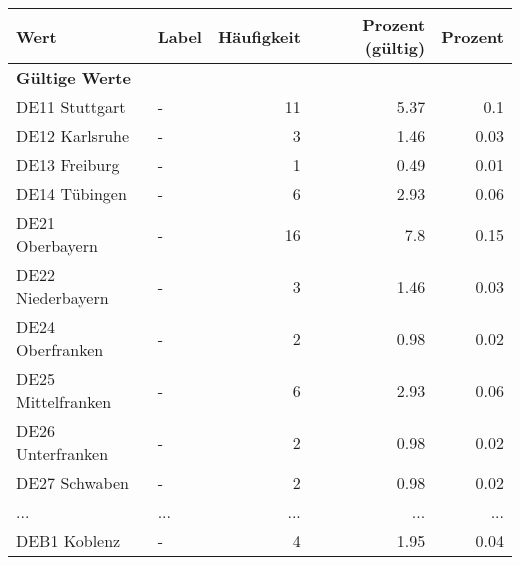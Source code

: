      \begin{longtable}{Xlrrr}
     \toprule
     \textbf{Wert} & \textbf{Label} & \textbf{Häufigkeit} & \textbf{Prozent (gültig)} & \textbf{Prozent} \\
     \endhead
     \midrule
     \multicolumn{5}{l}{\textbf{Gültige Werte}}\\
        \multicolumn{1}{X}{DE11 Stuttgart} & - & \num{11} & \num[round-mode=places,round-precision=2]{5.37} & \num[round-mode=places,round-precision=2]{0.1} \\
        \multicolumn{1}{X}{DE12 Karlsruhe} & - & \num{3} & \num[round-mode=places,round-precision=2]{1.46} & \num[round-mode=places,round-precision=2]{0.03} \\
        \multicolumn{1}{X}{DE13 Freiburg} & - & \num{1} & \num[round-mode=places,round-precision=2]{0.49} & \num[round-mode=places,round-precision=2]{0.01} \\
        \multicolumn{1}{X}{DE14 Tübingen} & - & \num{6} & \num[round-mode=places,round-precision=2]{2.93} & \num[round-mode=places,round-precision=2]{0.06} \\
        \multicolumn{1}{X}{DE21 Oberbayern} & - & \num{16} & \num[round-mode=places,round-precision=2]{7.8} & \num[round-mode=places,round-precision=2]{0.15} \\
        \multicolumn{1}{X}{DE22 Niederbayern} & - & \num{3} & \num[round-mode=places,round-precision=2]{1.46} & \num[round-mode=places,round-precision=2]{0.03} \\
        \multicolumn{1}{X}{DE24 Oberfranken} & - & \num{2} & \num[round-mode=places,round-precision=2]{0.98} & \num[round-mode=places,round-precision=2]{0.02} \\
        \multicolumn{1}{X}{DE25 Mittelfranken} & - & \num{6} & \num[round-mode=places,round-precision=2]{2.93} & \num[round-mode=places,round-precision=2]{0.06} \\
        \multicolumn{1}{X}{DE26 Unterfranken} & - & \num{2} & \num[round-mode=places,round-precision=2]{0.98} & \num[round-mode=places,round-precision=2]{0.02} \\
        \multicolumn{1}{X}{DE27 Schwaben} & - & \num{2} & \num[round-mode=places,round-precision=2]{0.98} & \num[round-mode=places,round-precision=2]{0.02} \\
       ... & ... & ... & ... & ... \\
        \multicolumn{1}{X}{DEB1 Koblenz} & - & \num{4} & \num[round-mode=places,round-precision=2]{1.95} & \num[round-mode=places,round-precision=2]{0.04} \\

\end{longtable}
